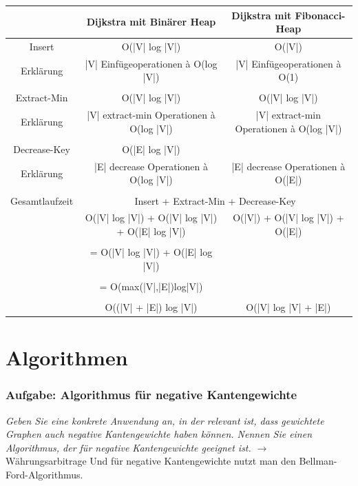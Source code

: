 \documentclass{article}
\begin{document}
\begin{table}[H]
    \centering
    \begin{tabular}{c| c c}
         & \textbf{Dijkstra \index{Dijkstra}mit Binärer Heap\index{Heap!binärer}}  & \textbf{Dijkstra mit Fibonacci-Heap\index{Heap!Fibonacci}} \\ \hline
        Insert & O(|V| log |V|) &  O(|V|) \\
        Erklärung & |V| Einfügeoperationen à O(log |V|) & |V| Einfügeoperationen à O(1)\\ \\
        Extract-Min  & O(|V| log |V|) & O(|V| log |V|) \\
        Erklärung & |V| extract-min Operationen à O(log |V|) & |V| extract-min Operationen à  O(log |V|) \\ \\
        Decrease-Key & O(|E| log |V|) & \\
        Erklärung & |E| decrease Operationen à O(log |V|) & |E| decrease Operationen à O(|E|) \\ \\
        Gesamtlaufzeit & \multicolumn{2}{c}{Insert + Extract-Min + Decrease-Key} & \\ 
         & O(|V| log |V|) + O(|V| log |V|) + O(|E| log |V|) 
         & O(|V|) + O(|V| log |V|) + O(|E|) \\ \\
         & = O(|V| log |V|) + O(|E| log |V|) 
         &  \\ \\
         & = O(max(|V|,|E|)log|V|) 
         & \\ \\
         & O((|V| + |E|) log |V|) & O(|V| log |V| + |E|)\\
    \end{tabular}
    \label{tab:my_label}
\end{table}

\newpage
\section{Algorithmen} 
\newpage
\subsubsection{Aufgabe: Algorithmus für negative Kantengewichte \textcolor{ForestGreen}{\CheckmarkBold}}  
\textit{Geben Sie eine konkrete Anwendung an, in der relevant ist, dass gewichtete Graphen auch negative Kantengewichte   haben können. Nennen Sie einen Algorithmus, der für negative Kantengewichte geeignet ist.}  \cite{probeklausur21} \cite{probeklausur24} \newline \noindent  
\large{ $\rightarrow$ Währungsarbitrage} \normalsize \newline
Und für negative Kantengewichte  nutzt man den Bellman-Ford-Algorithmus.
 \newpage
\end{document}
